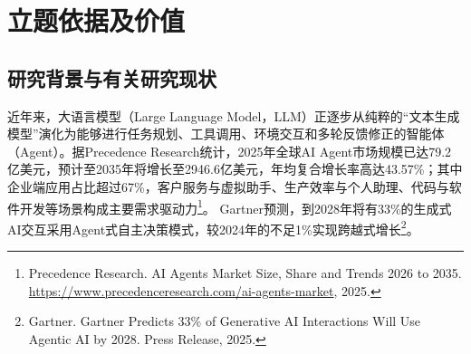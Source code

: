 \section{立题依据及价值}

\subsection{研究背景与有关研究现状}

近年来，大语言模型（Large Language Model，LLM）正逐步从纯粹的“文本生成模型”演化为能够进行任务规划、工具调用、环境交互和多轮反馈修正的智能体（Agent）。据Precedence Research统计，2025年全球AI Agent市场规模已达79.2亿美元，预计至2035年将增长至2946.6亿美元，年均复合增长率高达43.57\%；其中企业端应用占比超过67\%，客户服务与虚拟助手、生产效率与个人助理、代码与软件开发等场景构成主要需求驱动力\footnote{Precedence Research. AI Agents Market Size, Share and Trends 2026 to 2035. \url{https://www.precedenceresearch.com/ai-agents-market}, 2025.}。
Gartner预测，到2028年将有33\%的生成式AI交互采用Agent式自主决策模式，较2024年的不足1\%实现跨越式增长\footnote{Gartner. Gartner Predicts 33\% of Generative AI Interactions Will Use Agentic AI by 2028. Press Release, 2025.}。

